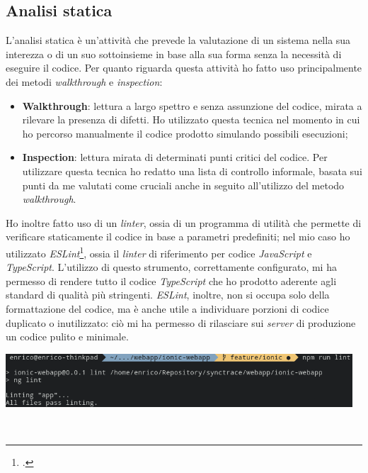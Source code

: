 \subsection{Analisi statica}

L'analisi statica è un'attività che prevede la valutazione di un sistema nella sua interezza o di un suo sottoinsieme in base alla sua forma senza la necessità di eseguire il codice. Per quanto riguarda questa attività ho fatto uso principalmente dei metodi \textit{walkthrough} e \textit{inspection}:

\begin{itemize}
  \item \textbf{Walkthrough}: lettura a largo spettro e senza assunzione del codice, mirata a rilevare la presenza di difetti. Ho utilizzato questa tecnica nel momento in cui ho percorso manualmente il codice prodotto simulando possibili esecuzioni;
  \item \textbf{Inspection}: lettura mirata di determinati punti critici del codice. Per utilizzare questa tecnica ho redatto una lista di controllo informale, basata sui punti da me valutati come cruciali anche in seguito all'utilizzo del metodo \textit{walkthrough}.
\end{itemize}

Ho inoltre fatto uso di un \textit{linter}, ossia di un programma di utilità che permette di verificare staticamente il codice in base a parametri predefiniti; nel mio caso ho utilizzato \textit{ESLint}\footcite{tec:eslint}, ossia il \textit{linter} di riferimento per codice \textit{JavaScript} e \textit{TypeScript}. L'utilizzo di questo strumento, correttamente configurato, mi ha permesso di rendere tutto il codice \textit{TypeScript} che ho prodotto aderente agli standard di qualità più stringenti. \textit{ESLint}, inoltre, non si occupa solo della formattazione del codice, ma è anche utile a individuare porzioni di codice duplicato o inutilizzato: ciò mi ha permesso di rilasciare sui \textit{server} di produzione un codice pulito e minimale. \\

\begin{minipage}{\linewidth}
  \centering
    \includegraphics[height=2cm]{immagini/nglint}
\end{minipage} \\

